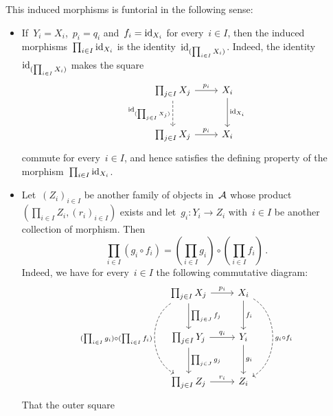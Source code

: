 \begin{remark*}
\begin{enumerate}
      This induced morphisms is funtorial in the following sense:
      \begin{itemize}
        \item
          If~$Y_i = X_i$,~$p_i = q_i$ and~$f_i = \operatorname{id}_{X_i}$ for every~$i \in I$, then the induced morphisms~$\prod_{i \in I} \operatorname{id}_{X_i}$ is the identity~$\operatorname{id}_{(\prod_{i \in I} X_i)}$.
          Indeed, the identity~$\operatorname{id}_{(\prod_{i \in I} X_i)}$ makes the square
          \[
            \begin{tikzcd}[row sep = large]
                \prod_{j \in I} X_j
                \arrow{r}[above]{p_i}
                \arrow[dashed]{d}[left]{\id_{(\prod_{j \in I} X_j)}}
              & X_i
                \arrow{d}[right]{\id_{X_i}}
              \\
                \prod_{j \in I} X_j
                \arrow{r}[above]{p_i}
              & X_i
            \end{tikzcd}
          \]
          commute for every~$i \in I$, and hence satisfies the defining property of the morphism~$\prod_{i \in I} \operatorname{id}_{X_i}$.
        \item
          Let~$(Z_i)_{i \in I}$ be another family of objects in~$\mathcal{A}$ whose product~$(\prod_{i \in I} Z_i, (r_i)_{i \in I})$ exists and let~$g_i \colon Y_i \to Z_i$ with~$i \in I$ be another collection of morphism.
          Then
          \[
              \prod_{i \in I} (g_i \circ f_i)
            =       \left( \prod_{i \in I} g_i \right)
              \circ \left( \prod_{i \in I} f_i \right) \,.
          \]
          Indeed, we have for every~$i \in I$ the following commutative diagram:
          \[
            \begin{tikzcd}[row sep = large]
                \prod_{j \in I} X_j
                \arrow{r}[above]{p_i}
                \arrow{d}[right]{\prod_{j \in J} f_j}
                \arrow[dashed, bend right = 60]{dd}[left]{(\prod_{i \in I} g_i) \circ (\prod_{i \in I} f_i)}
              & X_i
                \arrow{d}[right]{f_i}
                \arrow[dashed, bend left = 60]{dd}[right]{g_i \circ f_i}
              \\
                \prod_{j \in I} Y_j
                \arrow{r}[above]{q_i}
                \arrow{d}[right]{\prod_{j \in J} g_j}
              & Y_i
                \arrow{d}[right]{g_i}
              \\
                \prod_{j \in I} Z_j
                \arrow{r}[above]{r_i}
              & Z_i
            \end{tikzcd}
          \]
          That the outer square

\end{itemize}
\end{enumerate}
\end{remark*}
